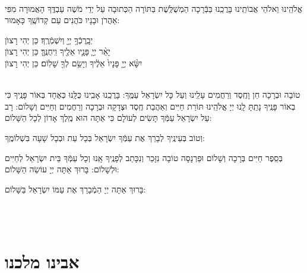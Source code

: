 \documentclass[twoside, openany, parskip=half, 11pt]{book}
\begin{document}
\begin{sometimes}
\sepline

\\
 אֱלֹהֵֽינוּ וֵאלֹהֵי אֲבוֹתֵֽינוּ בָּרֲכֵֽנוּ בַּבְּֿרָכָה הַמְשֻׁלֶּֽשֶׁת בַּתּוֹרָה 
הַכְּתוּבָה עַל יְדֵי מֹשֶׁה עַבְדֶּֽךָ הָאֲמוּרָה מִפִּי אַהֲרֹן וּבָנָיו כֹּהֲנִים עַם קְדוֹשֶֽׁךָ כָּאָמוּר: 

	יְבָֽרֶכְֿךָ֥ יְיָ֖ 	וְיִשְׁמְֿרֶֽךָ׃ \hfill \kahal כֵּן יְהִי רָצוׂן \\
	יָאֵ֨ר יְיָ֧ פָּנָ֛יו אֵלֶ֖יךָ וִֽיחֻנֶּֽךָּ׃ \hfill \kahal כֵּן יְהִי רָצוׂן \\
 יִשָּׂ֨א יְיָ֤ פָּנָיו֙ אֵלֶ֔יךָ וְיָשֵׂ֥ם לְךָ֖ שָׁלֽוֹם׃ \hfill \kahal כֵּן יְהִי רָצוׂן

\end{sometimes} \clearpage

\begin{paracol}{2}
\\
 טוֹבָה וּבְרָכָה חֵן וָחֶֽסֶד וְרַחֲמִים עָלֵֽינוּ וְעַל כָּל יִשְׂרָאֵל עַמֶּֽךָ: בָּרֲכֵֽנוּ אָבִֽינוּ כֻּלָּֽנוּ כְּאֶחָד בְּאוֹר פָּנֶֽיךָ כִּי בְאוֹר פָּנֶֽיךָ נָתַֽתָּ לָֽנוּ יְיָ אֱלֹהֵֽינוּ תּוֹרַת חַיִּים וְאַהֲבַת חֶֽסֶד וּצְדָקָה וּבְרָכָה וְרַחֲמִים וְחַיִּים וְשָׁלוֹם: 
\switchcolumn
{}
 רָב עַל יִשְׂרָאֵל עַמְּֿךָ תָּשִׂים לְעוֹלָם כִּי אַתָּה הוּא מֶֽלֶךְ אָדוֹן לְכָל הַשָּׁלוֹם:
\end{paracol}
 וְטוֹב בְּעֵינֶֽיךָ לְבָרֵךְ אֶת עַמְּֿךָ יִשְׂרָאֵל בְּכָל עֵת וּבְכָל שָׁעָה בִּשְׁלוֹמֶֽךָ:

\begin{paracol}{2}
\begin{small}
 בְּסֵֽפֶר חַיִּים בְּרָכָה וְשָׁלוֹם וּפַרְנָסָה טוֹבָה נִזָּכֵר וְנִכָּתֵב לְפָנֶֽיךָ אָֽנוּ וְכָל עַמְּֿךָ בֵּית יִשְׂרָאֵל לְחַיִּים וּלְשָׁלוֹם: בָּרוּךְ אַתָּה יְיָ עוֹשֵׂה הַשָּׁלוֹם:

\end{small}
\switchcolumn
בָּרוּךְ אַתָּה יְיָ הַמְֿבָרֵךְ אֶת עַמּוֹ יִשְׂרָאֵל בַּשָּׁלוֹם:

\end{paracol}


\tachanunim

\vfill

 \pageref{mincha aleinu}\\
 \pageref{mincha avinu malkeinu}\\


\section*{ אבינו מלכנו }
\end{document}
